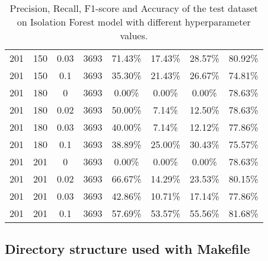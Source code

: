 \begin{table}[h]
{\begin{tabular}{cccccccc}
201                  & 150         & 0.03          & 3693         & 71.43\%            & 17.43\%         & 28.57\%     & 80.92\%           \\
201                  & 150         & 0.1           & 3693         & 35.30\%            & 21.43\%         & 26.67\%     & 74.81\%           \\
201                  & 180         & 0             & 3693         & 0.00\%             & 0.00\%          & 0.00\%      & 78.63\%           \\
201                  & 180         & 0.02          & 3693         & 50.00\%            & 7.14\%          & 12.50\%     & 78.63\%           \\
201                  & 180         & 0.03          & 3693         & 40.00\%            & 7.14\%          & 12.12\%     & 77.86\%           \\
201                  & 180         & 0.1           & 3693         & 38.89\%            & 25.00\%         & 30.43\%     & 75.57\%           \\
201                  & 201         & 0             & 3693         & 0.00\%             & 0.00\%          & 0.00\%      & 78.63\%           \\
201                  & 201         & 0.02          & 3693         & 66.67\%            & 14.29\%         & 23.53\%     & 80.15\%           \\
201                  & 201         & 0.03          & 3693         & 42.86\%            & 10.71\%         & 17.14\%     & 77.86\%           \\
201                  & 201         & 0.1           & 3693         & 57.69\%            & 53.57\%         & 55.56\%     & 81.68\%          
\end{tabular}}
    \caption{Precision, Recall, F1-score and Accuracy of the test dataset on Isolation Forest model with different hyperparameter values.}
    \label{tab:pca_tuning}
\end{table}

\newpage
\subsection{Directory structure used with Makefile}
\label{appendix:dir_structure}
 

